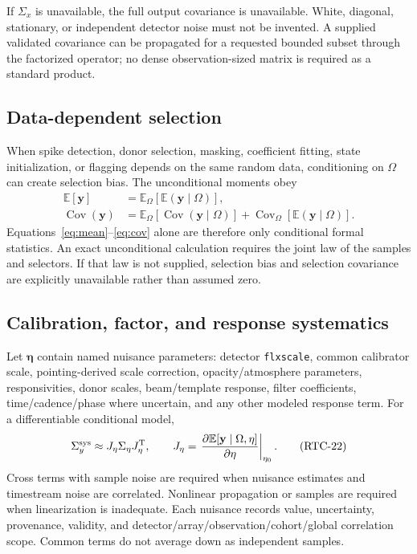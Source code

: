 \documentclass[11pt]{article}
\newcommand{\code}[1]{\nolinkurl{#1}}
\newcommand{\E}{\mathbb{E}}
\newcommand{\Cov}{\operatorname{Cov}}
\begin{document}
If $\Sigma_x$ is unavailable, the full output covariance is unavailable.
White, diagonal, stationary, or independent detector noise must not be
invented.  A supplied validated covariance can be propagated for a requested
bounded subset through the factorized operator; no dense observation-sized
matrix is required as a standard product.

\subsection{Data-dependent selection}

When spike detection, donor selection, masking, coefficient fitting, state
initialization, or flagging depends on the same random data, conditioning on
$\Omega$ can create selection bias.  The unconditional moments obey
\begin{align}
 \E[\mathbf y]&=\E_{\Omega}\!\left[
   \E(\mathbf y\mid\Omega)\right],
 \tag{RTC-20}\label{eq:totalmean}\\
 \Cov(\mathbf y)&=\E_{\Omega}\!\left[
   \Cov(\mathbf y\mid\Omega)\right]
  +\Cov_{\Omega}\!\left[
   \E(\mathbf y\mid\Omega)\right].
 \tag{RTC-21}\label{eq:totalcov}
\end{align}
Equations~\eqref{eq:mean}--\eqref{eq:cov} alone are therefore only conditional
formal statistics.  An exact unconditional calculation requires the joint law
of the samples and selectors.  If that law is not supplied, selection bias and
selection covariance are explicitly unavailable rather than assumed zero.

\subsection{Calibration, factor, and response systematics}

Let $\boldsymbol\eta$ contain named nuisance parameters: detector
\code{flxscale}, common calibrator scale, pointing-derived scale correction,
opacity/atmosphere parameters, responsivities, donor scales, beam/template
response, filter coefficients, time/cadence/phase where uncertain, and any
other modeled response term.  For a differentiable conditional model,
\begin{equation}
 \Sigma_y^{\rm sys}\approx
 J_{\eta}\Sigma_{\eta}J_{\eta}^{\mathrm T},
 \qquad
 J_{\eta}=\left.\frac{\partial\E[\mathbf y\mid\Omega,\eta]}
                       {\partial\eta}\right|_{\eta_0}.
 \tag{RTC-22}\label{eq:systematic}
\end{equation}
Cross terms with sample noise are required when nuisance estimates and
timestream noise are correlated.  Nonlinear propagation or samples are
required when linearization is inadequate.  Each nuisance records value,
uncertainty, provenance, validity, and detector/array/observation/cohort/global
correlation scope.  Common terms do not average down as independent samples.
\end{document}
